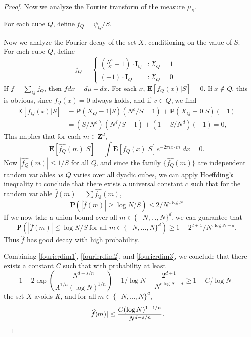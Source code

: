 \begin{proof}
    Now we analyze the Fourier transform of the measure $\mu_S$. 

    For each cube $Q$, define $f_Q = \psi_Q / S$.

    Now we analyze the Fourier decay of the set $X$, conditioning on the value of $S$. For each cube $Q$, define
    \[ f_Q = \begin{cases} \left( \frac{N^d}{S} - 1 \right) \cdot \mathbf{I}_Q & : X_Q = 1, \\ \left( -1 \right) \cdot \mathbf{I}_Q & : X_Q = 0. \end{cases} \]
    If $f = \sum_Q f_Q$, then $f dx = d\mu - dx$. For each $x$, $\mathbf{E}[f_Q(x)|S] = 0$. If $x \not \in Q$, this is obvious, since $f_Q(x) = 0$ always holds, and if $x \in Q$, we find
    \begin{align*}
        \mathbf{E}[f_Q(x)|S] &= \mathbf{P}(X_Q = 1|S) (N^d/S - 1) + \mathbf{P}(X_Q = 0|S) (-1)\\
        &= (S/N^d)(N^d/S - 1) + (1 - S/N^d)(-1) = 0,
    \end{align*}
    This implies that for each $m \in \mathbf{Z}^d$,
    \[ \mathbf{E} \left[ \widehat{f_Q}(m)|S \right] = \int \mathbf{E}[f_Q(x) | S] e^{- 2 \pi i x \cdot m}\; dx = 0. \]
    Now $|\widehat{f_Q}(m)| \leq 1/S$ for all $Q$, and since the family $\big\{ \widehat{f_Q}(m) \big\}$ are independent random variables as $Q$ varies over all dyadic cubes, we can apply Hoeffding's inequality to conclude that there exists a universal constant $c$ such that for the random variable $\widehat{f}(m) = \sum \widehat{f_Q}(m)$,
    \[ \mathbf{P} \left( |\widehat{f}(m)| \geq \log N /S \right) \leq 2/N^{c \log N} \]
    If we now take a union bound over all $m \in \{ -N, \dots, N \}^d$, we can guarantee that
    \begin{equation} \label{fourierdim3}
        \mathbf{P} \left( |\widehat{f}(m)| \leq \log N/S\ \text{for all $m \in \{ -N, \dots, N\}^d$} \right) \geq 1 - 2^{d+1}/N^{c \log N - d}.
    \end{equation}
    Thus $\widehat{f}$ has good decay with high probability.

    Combining \eqref{fourierdim1}, \eqref{fourierdim2}, and \eqref{fourierdim3}, we conclude that there exists a constant $C$ such that with probability at least
    \[ 1 - 2 \exp \left( \frac{-N^{d-s/n}}{A^{1/n} (\log N)^{1/n}} \right) - 1/\log N - \frac{2^{d+1}}{N^{c \log N - d}} \geq 1 - C / \log N, \]
    the set $X$ avoids $K$, and for all $m \in \{ -N, \dots, N \}^d$,
    \[ |\widehat{f}(m)| \leq \frac{C (\log N)^{1-1/n}}{N^{d-s/n}}. \qedhere \]
\end{proof}

